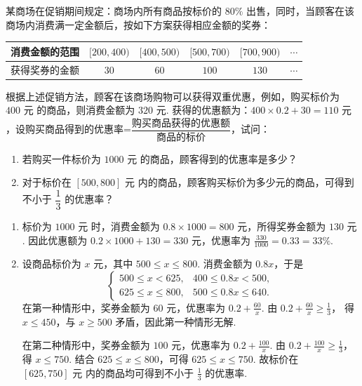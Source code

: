 \begin{problem}
某商场在促销期间规定：商场内所有商品按标价的 \(80\%\) 出售，同时，当顾客在该商场内消费满一定金额后，按如下方案获得相应金额的奖券：

\begin{center}
\begin{tabular}{|c|c|c|c|c|c|}
\hline
消费金额的范围 & \([200,400)\) & \([400,500)\) & \([500,700)\) & \([700,900)\) & \(\cdots\) \\
\hline
获得奖券的金额 & \(30\) & \(60\) & \(100\) & \(130\) & \(\cdots\) \\
\hline
\end{tabular}
\end{center}

根据上述促销方法，顾客在该商场购物可以获得双重优惠，例如，购买标价为 \(400\text{ 元}\) 的商品，则消费金额为 \(320\text{ 元}\). 获得的优惠额为：\(400 \times 0.2 + 30 = 110\text{ 元}\)，设购买商品得到的优惠率=\(\dfrac{\text{购买商品获得的优惠额}}{\text{商品的标价}}\)，试问：

\begin{enumerate}
\item 若购买一件标价为 \(1000\text{ 元}\) 的商品，顾客得到的优惠率是多少？
\item 对于标价在 \([500,800]\text{ 元}\) 内的商品，顾客购买标价为多少元的商品，可得到不小于 \(\dfrac{1}{3}\) 的优惠率？
\end{enumerate}
\end{problem}

\begin{solution}
\begin{enumerate}
\item 标价为 \(1000\text{ 元}\) 时，消费金额为 \(0.8\times1000=800\text{ 元}\)，所得奖券金额为 \(130\text{ 元}\). 因此优惠额为 \(0.2\times1000+130=330\text{ 元}\)，优惠率为
\(\frac{330}{1000}=0.33=33\%\).

\item 设商品标价为 \(x\text{ 元}\)，其中 \(500\leqslant x\leqslant800\). 消费金额为 \(0.8x\)，于是
\[
\begin{cases}
500\leqslant x<625,&400\leqslant0.8x<500,\\
625\leqslant x\leqslant800,&500\leqslant0.8x\leqslant640.
\end{cases}
\]
在第一种情形中，奖券金额为 \(60\text{ 元}\)，优惠率为 \(0.2+\frac{60}{x}\). 由 \(0.2+\frac{60}{x}\geqslant\frac{1}{3}\)，
得 \(x\leqslant450\)，与 \(x\geqslant500\) 矛盾，因此第一种情形无解.

在第二种情形中，奖券金额为 \(100\text{ 元}\)，优惠率为 \(0.2+\frac{100}{x}\). 由 \(0.2+\frac{100}{x}\geqslant\frac{1}{3}\)，
得 \(x\leqslant750\). 结合 \(625\leqslant x\leqslant800\)，可得
\(625\leqslant x\leqslant750\).
故标价在 \([625,750]\text{ 元}\) 内的商品均可得到不小于 \(\frac{1}{3}\) 的优惠率.
\end{enumerate}
\end{solution}

